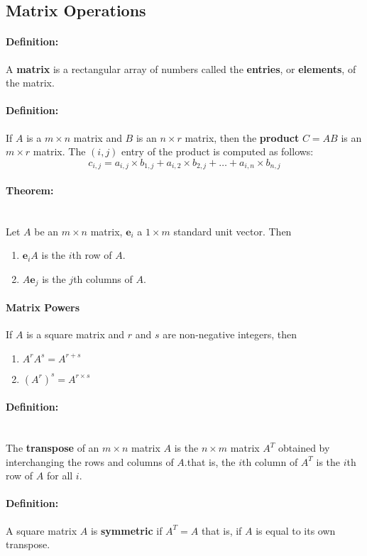 \documentclass[12pt]{article}
\newenvironment{theorem}{\paragraph{Theorem:\hfill}}{\hfill}
\newenvironment{definition}{\paragraph{Definition: }}{\hfill}
\begin{document}
\subsection{Matrix Operations}

\begin{definition}
	A \textbf{matrix} is a rectangular array of numbers called the \textbf{entries}, or \textbf{elements}, of the matrix.
\end{definition}

\begin{definition}
	If $A$ is a $m \times n$ matrix and $B$ is an $n \times r$ matrix, then the \textbf{product} $C = AB$ is an $m \times r$ matrix. The $(i, j)$ entry of the product is computed as follows:
	\[
		c_{i,j} = a_{i,j} \times b_{1,j} + a_{i,2} \times b_{2, j} + \dots + a_{i,n} \times b_{n,j}
	\]
\end{definition}

\begin{theorem}
	\hfill
	\\
	
	Let $A$ be an $m \times n$ matrix, $\textbf{e}_i$ a $1 \times m$ standard unit vector. Then
	\begin{enumerate}
		\item $\textbf{e}_i A$ is the $i$th row of $A$.
		\item $A \textbf{e}_j$ is the $j$th columns of $A$.
	\end{enumerate}
\end{theorem}

\paragraph{Matrix Powers}
If $A$ is a square matrix and $r$ and $s$ are non-negative integers, then
\begin{enumerate}
	\item $A^rA^s = A^{r + s}$
	\item $(A^r)^s = A^{r \times s}$
\end{enumerate}

\begin{definition}
	\hfill
	\\
	The \textbf{transpose} of an $m \times n$ matrix $A$ is the $n \times m$ matrix $A^T$ obtained by interchanging the rows and columns of $A$.that is, the $i$th column of $A^T$ is the $i$th row of $A$ for all $i$.
\end{definition}

\begin{definition}
	A square matrix $A$ is \textbf{symmetric} if $A^T = A$ that is, if $A$ is equal to its own transpose.
\end{definition}
\end{document}
